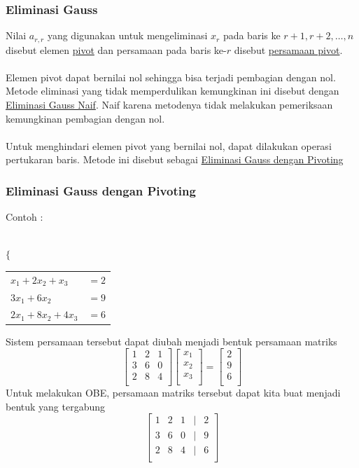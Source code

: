 \documentclass{beamer}
\begin{document}
\begin{frame}
\frametitle{Eliminasi Gauss}
Nilai $a_{r,r}$ yang digunakan untuk mengeliminasi $x_r$ pada baris ke $r+1,r+2, \dots, n$ disebut elemen \underline{pivot} dan persamaan pada baris ke-$r$ disebut \underline{persamaan pivot}.
\\\ \\
Elemen pivot dapat bernilai nol sehingga bisa terjadi pembagian dengan nol. Metode eliminasi yang tidak memperdulikan kemungkinan ini disebut dengan \underline{Eliminasi Gauss Naif}. Naif karena metodenya tidak melakukan pemeriksaan kemungkinan pembagian dengan nol.
\\\ \\Untuk menghindari elemen pivot yang bernilai nol, dapat dilakukan operasi pertukaran baris. Metode ini disebut sebagai \underline{Eliminasi Gauss dengan Pivoting}
\end{frame}


\begin{frame}
\frametitle{Eliminasi Gauss dengan Pivoting}
Contoh : \\\ \\
\begin{center}$\Biggl\{$\begin{tabular}{ll}
	$x_1+2x_2+x_3$ & $=2$\\
	$3x_1+6x_2$ & $=9$\\
	$2x_1+8x_2+4x_3$ & $=6$\\
\end{tabular}
\end{center}
Sistem persamaan tersebut dapat diubah menjadi bentuk persamaan matriks
\begin{equation}
\begin{bmatrix}
	1 & 2 & 1\\
	3 & 6 & 0\\
	2 & 8 & 4\\
\end{bmatrix}
\begin{bmatrix}
	x_1\\
	x_2\\
	x_3\\
\end{bmatrix}=
\begin{bmatrix}
	2\\
	9\\
	6\\
\end{bmatrix}
\nonumber
\end{equation}
Untuk melakukan OBE, persamaan matriks tersebut dapat kita buat menjadi bentuk yang tergabung
\begin{equation}
\begin{bmatrix}
	1 & 2 & 1 & | & 2\\
	3 & 6 & 0& | & 9\\
	2 & 8 & 4 & | & 6\\
	\end{bmatrix}
\nonumber
\end{equation}

\end{frame}
\end{document}
